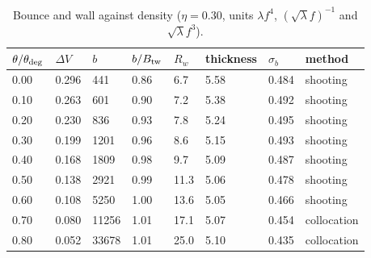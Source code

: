 \documentclass[preprint,12pt]{elsarticle}
\begin{document}
\begin{table}[htbp]\centering\footnotesize\setlength{\tabcolsep}{3pt}
\caption{Bounce and wall against density ($\eta=0.30$, units $\lambda f^4$, $(\sqrt\lambda f)^{-1}$ and $\sqrt\lambda f^3$).}
\begin{tabular}{llllllll}
\toprule
$\theta/\theta_{\rm deg}$ & $\Delta V$ & $b$ & $b/B_{\rm tw}$ & $R_w$ & thickness & $\sigma_b$ & method \\ \midrule
0.00 & 0.296 & 441 & 0.86 & 6.7 & 5.58 & 0.484 & shooting \\
0.10 & 0.263 & 601 & 0.90 & 7.2 & 5.38 & 0.492 & shooting \\
0.20 & 0.230 & 836 & 0.93 & 7.8 & 5.24 & 0.495 & shooting \\
0.30 & 0.199 & 1201 & 0.96 & 8.6 & 5.15 & 0.493 & shooting \\
0.40 & 0.168 & 1809 & 0.98 & 9.7 & 5.09 & 0.487 & shooting \\
0.50 & 0.138 & 2921 & 0.99 & 11.3 & 5.06 & 0.478 & shooting \\
0.60 & 0.108 & 5250 & 1.00 & 13.6 & 5.05 & 0.466 & shooting \\
0.70 & 0.080 & 11256 & 1.01 & 17.1 & 5.07 & 0.454 & collocation \\
0.80 & 0.052 & 33678 & 1.01 & 25.0 & 5.10 & 0.435 & collocation \\
\bottomrule
\end{tabular}
\end{table}
\end{document}

